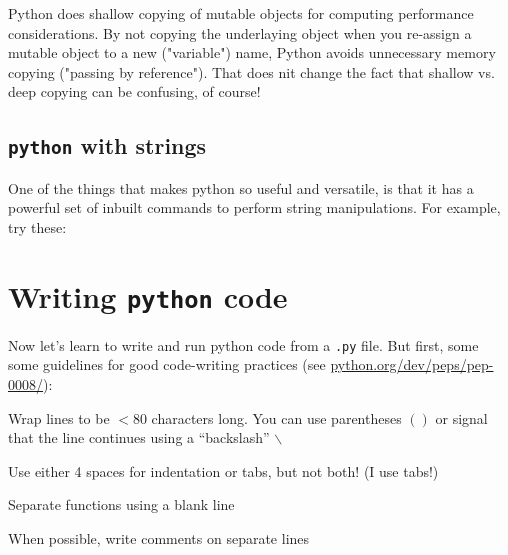 \begin{tipbox}
	Python does shallow copying of mutable objects for computing performance considerations. By not copying the underlaying object when you re-assign a mutable object to a new ("variable") name, Python avoids unnecessary memory copying ("passing by reference"). That does nit change the fact that shallow vs. deep copying can be confusing, of course!
\end{tipbox} 

\subsection{{\tt python} with strings}

One of the things that makes python so useful and versatile, is that it 
has a powerful set of inbuilt commands to perform string manipulations. 
For example, try these: 



\section{Writing {\tt python} code}

Now let's learn to write and run python code from a {\tt *.py} file. 
But first, some some guidelines for good code-writing practices (see
\url{python.org/dev/peps/pep-0008/}):
  \begin{compactitem} \itemsep8pt
    \item Wrap lines to be $<$80 characters long. You can use parentheses $()$
  or signal that the line continues using a ``backslash'' $\backslash$
    \item Use either 4 spaces for indentation or tabs, but not both! (I use tabs!)
    \item Separate functions using a blank line
    \item When possible, write comments on separate lines
  \end{compactitem}

